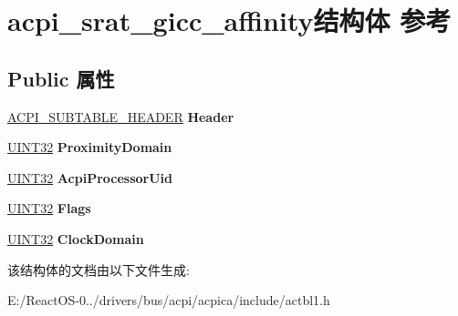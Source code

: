\hypertarget{structacpi__srat__gicc__affinity}{}\section{acpi\+\_\+srat\+\_\+gicc\+\_\+affinity结构体 参考}
\label{structacpi__srat__gicc__affinity}
\subsection*{Public 属性}
\begin{DoxyCompactItemize}
\item 
\mbox{\label{structacpi__srat__gicc__affinity_a7ea966e41a8a900a6290d351931c5a8d}} 
\hyperlink{structacpi__subtable__header}{A\+C\+P\+I\+\_\+\+S\+U\+B\+T\+A\+B\+L\+E\+\_\+\+H\+E\+A\+D\+ER} {\bfseries Header}
\item 
\mbox{\label{structacpi__srat__gicc__affinity_a5e652139c914097a36250d4cf86ad2e7}} 
\hyperlink{_processor_bind_8h_ae1e6edbbc26d6fbc71a90190d0266018}{U\+I\+N\+T32} {\bfseries Proximity\+Domain}
\item 
\mbox{\label{structacpi__srat__gicc__affinity_a496afed465a3e8f0707a2b2525f7b257}} 
\hyperlink{_processor_bind_8h_ae1e6edbbc26d6fbc71a90190d0266018}{U\+I\+N\+T32} {\bfseries Acpi\+Processor\+Uid}
\item 
\mbox{\label{structacpi__srat__gicc__affinity_ab216c3e6db657337bb5ab0e5b2cece8e}} 
\hyperlink{_processor_bind_8h_ae1e6edbbc26d6fbc71a90190d0266018}{U\+I\+N\+T32} {\bfseries Flags}
\item 
\mbox{\label{structacpi__srat__gicc__affinity_a07dcc0dafa35a8251f5135a5e5e12cf5}} 
\hyperlink{_processor_bind_8h_ae1e6edbbc26d6fbc71a90190d0266018}{U\+I\+N\+T32} {\bfseries Clock\+Domain}
\end{DoxyCompactItemize}


该结构体的文档由以下文件生成\+:\begin{DoxyCompactItemize}
\item 
E\+:/\+React\+O\+S-\/0../drivers/bus/acpi/acpica/include/actbl1.\+h\end{DoxyCompactItemize}
